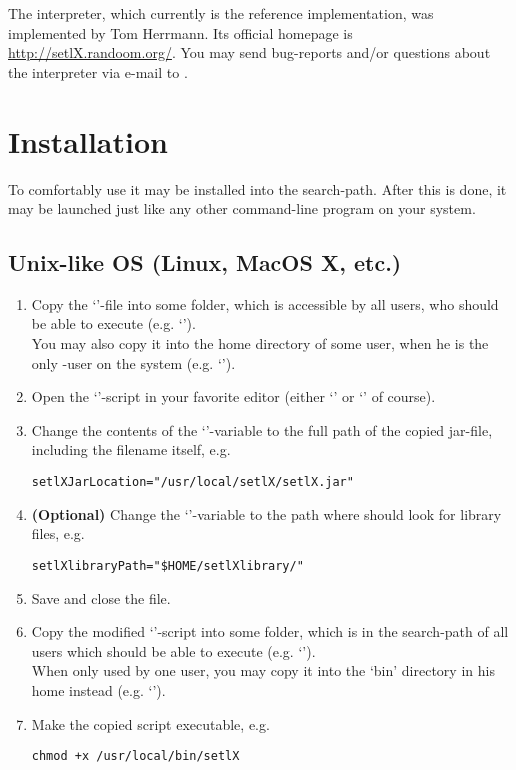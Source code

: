 The \setlX{} interpreter, which currently is the \SetlX{} reference implementation, was implemented by Tom Herrmann. Its official homepage is \url{http://setlX.randoom.org/}. You may send bug-reports and\slash{}or questions about the \setlX{} interpreter via e-mail to .


\section{Installation}

To comfortably use \setlX{} it may be installed into the search-path. After this is done, it may be launched just like any other command-line program on your system.

\subsection{Unix-like OS (Linux, MacOS X, etc.)}\label{Unix}

\begin{enumerate}
	\item Copy the `'-file into some folder, which is accessible by all users, who should be able to execute \setlX{} (e.g. `').\\
	You may also copy it into the home directory of some user, when he is the only \setlX-user on the system (e.g. `').
	\item Open the `'-script in your favorite editor (either `' or `' of course).
	\item Change the contents of the `'-variable to the full path of the copied jar-file, including the filename itself, e.g.
\begin{lstlisting}[frame=none,numbers=none]
setlXJarLocation="/usr/local/setlX/setlX.jar"
\end{lstlisting}
	\item \textbf{(Optional)} Change the `'-variable to the path where \setlX{} should look for library files, e.g.
\begin{lstlisting}[frame=none,numbers=none]
setlXlibraryPath="$HOME/setlXlibrary/"
\end{lstlisting}
	\item Save and close the file.
	\item Copy the modified `'-script into some folder, which is in the search-path of all users which should be able to execute \setlX{} (e.g. `').\\
	When only used by one user, you may copy it into the `bin' directory in his home instead (e.g. `').
	\item Make the copied script executable, e.g.
\begin{lstlisting}[frame=none,numbers=none]
chmod +x /usr/local/bin/setlX
\end{lstlisting}
	
\end{enumerate}

